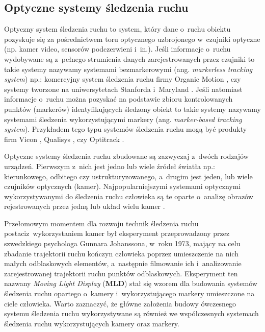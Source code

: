 \subsection{Optyczne systemy śledzenia ruchu}
Optyczny system śledzenia ruchu to system, który dane o~ruchu obiektu pozyskuje się za pośrednictwem toru optycznego uzbrojonego w~czujniki optyczne (np. kamer video, sensorów podczerwieni i~in.). Jeśli informacje o~ruchu wydobywane są z~pełnego strumienia danych zarejestrowanych przez czujniki to takie systemy nazywamy systemami bezmarkerowymi (ang. \textsl{markerless tracking system}) np.: komercyjny system śledzenia ruchu firmy Organic Motion , czy systemy tworzone na uniwersytetach Stanforda  i~Maryland \cite{Sundaresan2005,Sundaresan2007}. Jeśli natomiast informacje o~ruchu można pozyskać na podstawie zbioru kontrolowanych punktów (markerów) identyfikujących śledzony obiekt to takie systemy nazywamy systemami śledzenia wykorzystującymi markery (ang. \textsl{marker-based tracking system}). Przykładem tego typu systemów śledzenia ruchu mogą być produkty firm Vicon , Qualisys , czy Optitrack .

Optyczne systemy śledzenia ruchu zbudowane są zazwyczaj z~dwóch rodzajów urządzeń. Pierwszym z~nich jest jedno lub wiele źródeł światła np.: kierunkowego, odbitego czy ustrukturyzowanego, a~drugim jest jeden, lub wiele czujników optycznych (kamer). Najpopularniejszymi systemami optycznymi wykorzystywanymi do śledzenia ruchu człowieka są te oparte o~analizę obrazów rejestrowanych przez jedną \cite{schmidt2006kernel,RuiLi2006} lub układ wielu kamer  \cite{Sundaresan2005}. 

Przełomowym momentem dla rozwoju technik śledzenia ruchu postaciz~wykorzystaniem kamer był eksperyment przeprowadzony przez szwedzkiego psychologa Gunnara Johanssona, w~roku 1973, mający na celu zbadanie trajektorii ruchu kończyn człowieka poprzez umieszczenie na nich małych odblaskowych elementów, a~następnie filmowanie ich i~analizowanie zarejestrowanej trajektorii ruchu punktów odblaskowych. Eksperyment ten nazwany \emph{Moving Light Display} (\textbf{MLD}) \cite{Johansson1973} stał się wzorem dla budowania systemów śledzenia ruchu opartego o~kamery i~wykorzystującego markery umieszczone na ciele człowieka. Warto zaznaczyć, że główne założenia budowy ówczesnego systemu śledzenia ruchu wykorzystywane są również we współczesnych systemach śledzenia ruchu wykorzystujących kamery oraz markery.

